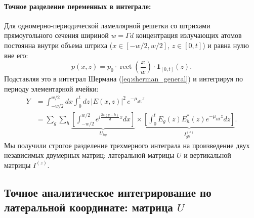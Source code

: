 \documentclass[a4paper,11pt]{article}
\begin{document}
\paragraph{Точное разделение переменных в интеграле:}
Для одномерно-периодической ламеллярной решетки со штрихами прямоугольного сечения шириной $w = \Gamma d$ концентрация излучающих атомов постоянна внутри объема штриха ($x \in [-w/2, w/2]$, $z \in [0, t]$) и равна нулю вне его:
\begin{equation}
    p(x, z) = p_0 \cdot \operatorname{rect}\left(\frac{x}{w}\right) \cdot \mathbf{1}_{[0, t]}(z).
\end{equation}
Подставляя это в интеграл Шермана (\ref{eq:sherman_general}) и интегрируя по периоду элементарной ячейки:
\begin{align}
    Y &= \int_{-w/2}^{w/2} dx \int_0^t dz \, |E(x, z)|^2 \, e^{-\mu_{\text{att}} z} \nonumber \\
    &= \sum_g \sum_h \underbrace{\left[ \int_{-w/2}^{w/2} e^{i \frac{2\pi (g - h)}{d} x} dx \right]}_{U_{hg}} \times \underbrace{\left[ \int_0^t E_g(z) E_h^*(z) e^{-\mu_{\text{att}} z} dz \right]}_{I_{gh}^{(z)}}.
    \label{eq:separated_master}
\end{align}
Мы получили строгое разделение трехмерного интеграла на произведение двух независимых двумерных матриц: латеральной матрицы $U$ и вертикальной матрицы $I^{(z)}$.

\subsection{Точное аналитическое интегрирование по латеральной координате: матрица \texorpdfstring{$U$}{U}}
\end{document}

